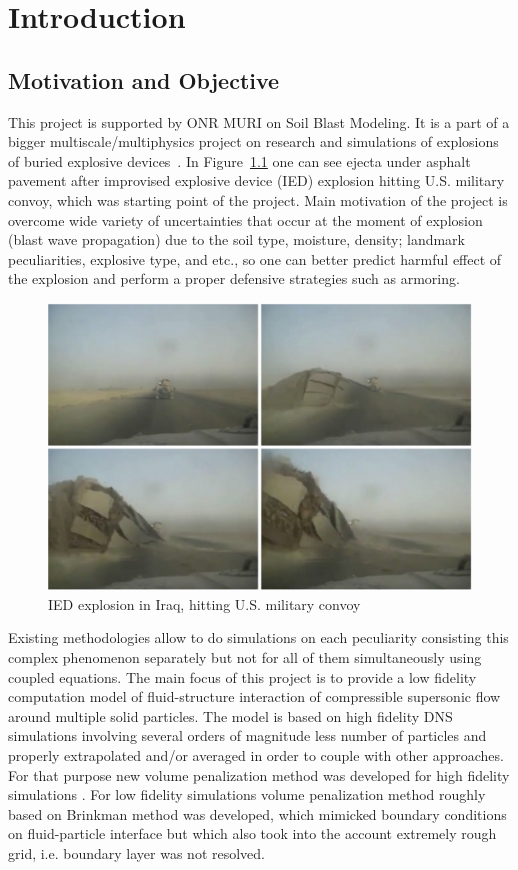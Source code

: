 \chapter{Introduction}
\label{chapter:1}

\section{Motivation and Objective}
This project is supported by ONR MURI on Soil Blast Modeling. It is a part of a bigger multiscale/multiphysics project on research and simulations of explosions of buried explosive devices~\cite{proc:muri}. In Figure~\ref{fig:muri_motiv} one can see ejecta under asphalt pavement after improvised explosive device (IED) explosion hitting U.S. military convoy, which was starting point of the project. Main motivation of the project is overcome wide variety of uncertainties that occur at the moment of explosion (blast wave propagation) due to the soil type, moisture, density; landmark peculiarities, explosive type, and etc., so one can better predict harmful effect of the explosion and perform a proper defensive strategies such as armoring.
\begin{figure}[h!]
\centering \includegraphics[scale=0.25]{fig/muri_motiv.png}
\caption{IED explosion in Iraq, hitting U.S. military convoy} \label{fig:muri_motiv}
\end{figure}

Existing methodologies allow to do simulations on each peculiarity consisting this complex phenomenon separately but not for all of them simultaneously using coupled equations. The main focus of this project is to provide a low fidelity computation model of fluid-structure interaction of compressible supersonic flow around multiple solid particles. The model is based on high fidelity DNS simulations involving several orders of magnitude less number of particles and properly extrapolated and/or averaged in order to couple with other approaches. For that purpose new volume penalization method was developed for high fidelity simulations \cite{ebd_nk_ovv_cbvp_jcp}. For low fidelity simulations volume penalization method roughly based on Brinkman method was developed, which mimicked boundary conditions on fluid-particle interface but which also took into the account extremely rough grid, i.e. boundary layer was not resolved.
